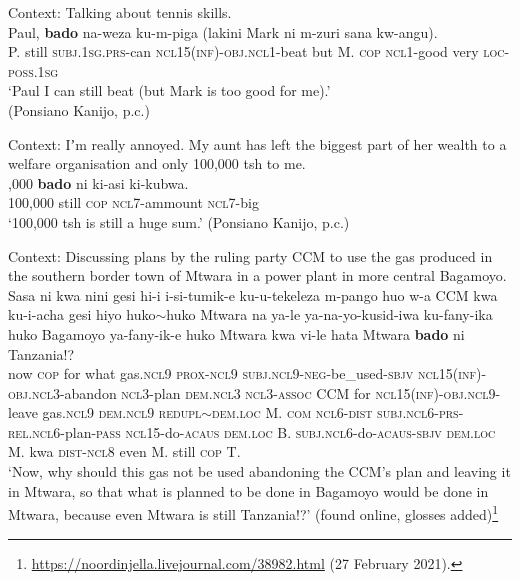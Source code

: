 \begin{exe}
	\ex\label{exAppendixSwahiliMarginal1}
	Context: Talking about tennis skills.\\
	\gll Paul, \textbf{bado} na-weza ku-m-piga (lakini Mark ni m-zuri sana kw-angu).\\
	P. still \textsc{subj}.1\textsc{sg}.\textsc{prs}-can \textsc{ncl}15(\textsc{inf})-\textsc{obj}.\textsc{ncl}1-beat \phantom{(}but M. \textsc{cop} \textsc{ncl}1-good very \textsc{loc}-\textsc{poss}.1\textsc{sg}\\
	\glt \lq Paul I can still beat (but Mark is too good for me).'
	\\(Ponsiano Kanijo, p.c.)
	
	\ex\label{exAppendixSwahiliMarginal2}
	Context: Iʼm really annoyed. My aunt has left the biggest part of her wealth to a welfare organisation and only 100,000 tsh to me.\\
	,000 \textbf{bado} ni ki-asi ki-kubwa.\\
	100,000 still \textsc{cop} \textsc{ncl}7-ammount \textsc{ncl}7-big\\
	\glt \lq 100,000 tsh is still a huge sum.' (Ponsiano Kanijo, p.c.)
	
	\ex\label{exAppendixSwahiliMarginal3}
	Context: Discussing plans by the ruling party CCM to use the gas produced in the southern border town of Mtwara in a power plant in more central Bagamoyo.\\
	\gll Sasa ni kwa nini gesi hi-i i-si-tumik-e ku-u-tekeleza m-pango huo w-a CCM kwa ku-i-acha gesi hiyo huko$\sim$huko Mtwara na ya-le ya-na-yo-kusid-iwa ku-fany-ika huko Bagamoyo ya-fany-ik-e huko Mtwara kwa vi-le hata Mtwara \textbf{bado} ni Tanzania!?\\
	now \textsc{cop} for what gas.\textsc{ncl}9 \textsc{prox}-\textsc{ncl}9 \textsc{subj}.\textsc{ncl}9-\textsc{neg}-be\_used-\textsc{sbjv} \textsc{ncl}15(\textsc{inf})-\textsc{obj}.\textsc{ncl}3-abandon \textsc{ncl}3-plan \textsc{dem}.\textsc{ncl}3 \textsc{ncl}3-\textsc{assoc} CCM for \textsc{ncl}15(\textsc{inf})-\textsc{obj}.\textsc{ncl}9-leave gas.\textsc{ncl}9 \textsc{dem}.\textsc{ncl}9 \textsc{redupl}$\sim$\textsc{dem}.\textsc{loc} M. \textsc{com} \textsc{ncl}6-\textsc{dist} \textsc{subj}.\textsc{ncl}6-\textsc{prs}-\textsc{rel}.\textsc{ncl}6-plan-\textsc{pass} \textsc{ncl}15-do-\textsc{acaus} \textsc{dem}.\textsc{loc} B. \textsc{subj}.\textsc{ncl}6-do-\textsc{acaus}-\textsc{sbjv} \textsc{dem}.\textsc{loc} M. kwa \textsc{dist}-\textsc{ncl}8 even M. still \textsc{cop} T.\\
	\glt \lq Now, why should this gas not be used abandoning the CCM's plan and leaving it in Mtwara, so that what is planned to be done in Bagamoyo would be done in Mtwara, because even Mtwara is still Tanzania!?' (found online, glosses added)\footnote{\url{https://noordinjella.livejournal.com/38982.html} (27 February 2021).}
\end{exe}

